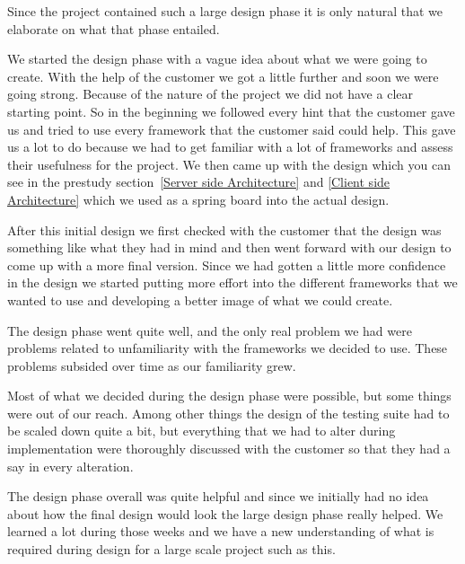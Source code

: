 Since the project contained such a large design phase it is only natural that we elaborate on what that phase entailed.

We started the design phase with a vague idea about what we were going to create. With the help of the customer we got a little further and soon we were going strong. Because of the nature of the project we did not have a clear starting point. So in the beginning we followed every hint that the customer gave us and tried to use every framework that the customer said could help. This gave us a lot to do because we had to get familiar with a lot of frameworks and assess their usefulness for the project. We then came up with the design which you can see in the prestudy section~\ref{Server side Architecture} and \ref{Client side Architecture} which we used as a spring board into the actual design.

After this initial design we first checked with the customer that the design was something like what they had in mind and then went forward with our design to come up with a more final version. Since we had gotten a little more confidence in the design we started putting more effort into the different frameworks that we wanted to use and developing a better image of what we could create.

The design phase went quite well, and the only real problem we had were problems related to unfamiliarity with the frameworks we decided to use. These problems subsided over time as our familiarity grew.

Most of what we decided during the design phase were possible, but some things were out of our reach. Among other things the design of the testing suite had to be scaled down quite a bit, but everything that we had to alter during implementation were thoroughly discussed with the customer so that they had a say in every alteration.

The design phase overall was quite helpful and since we initially had no idea about how the final design would look the large design phase really helped. We learned a lot during those weeks and we have a new understanding of what is required during design for a large scale project such as this.
